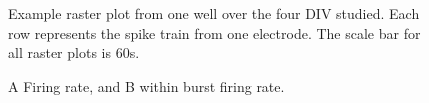 \documentclass{article}
\begin{document}
\pagestyle{empty}


\makeatletter
\@fpsep\textheight
\makeatother

\begin{figure}
  \centering
  \caption{Example raster plot from one well over the four DIV
studied. Each row represents the spike train from one electrode. The
scale bar for all raster plots is 60s.}
\end{figure}

\begin{figure}
  \centering
  \caption{A Firing rate, and B within burst firing rate.}
\end{figure}
\end{document}
